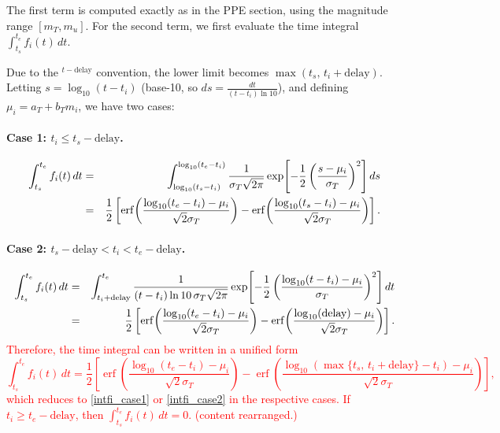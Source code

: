 \documentclass[extra,mreferee]{gji}
\theoremstyle{lemma}
\begin{document}
The first term is computed exactly as in the PPE section, using the magnitude range $[m_T, m_u]$. For the second term, we first evaluate the time integral $\int_{t_s}^{t_e} f_i(t)\, dt$.

Due to the ${}^{t - \text{delay}}$ convention, the lower limit becomes $\max(t_s,\, t_i + \text{delay})$. Letting $s = \log_{10}(t - t_i)$ (base-10, so $ds = \frac{dt}{(t - t_i)\ln 10}$), and defining $\mu_i = a_T + b_T m_i$, we have two cases:

\paragraph{Case 1: $t_i \le t_s - \text{delay}$.}
\begin{eqnarray}\label{intfi_case1}
\int_{t_s}^{t_e} f_i(t)\, dt 
&=& \int_{\log_{10}(t_s - t_i)}^{\log_{10}(t_e - t_i)} \frac{1}{\sigma_T \sqrt{2\pi}} 
\exp\!\left[-\frac{1}{2} \left( \frac{s - \mu_i}{\sigma_T} \right)^2 \right] ds \notag \\
&=& \frac{1}{2} \left[ \operatorname{erf}\!\left( \frac{\log_{10}(t_e - t_i) - \mu_i}{\sqrt{2}\sigma_T} \right)
- \operatorname{erf}\!\left( \frac{\log_{10}(t_s - t_i) - \mu_i}{\sqrt{2}\sigma_T} \right) \right].
\end{eqnarray}

\paragraph{Case 2: $t_s - \text{delay} < t_i < t_e - \text{delay}$.}
\begin{eqnarray}\label{intfi_case2}
\int_{t_s}^{t_e} f_i(t)\, dt 
&=& \int_{t_i + \text{delay}}^{t_e} \frac{1}{(t - t_i)\ln 10\, \sigma_T \sqrt{2\pi}} 
\exp\!\left[-\frac{1}{2} \left( \frac{\log_{10}(t - t_i) - \mu_i}{\sigma_T} \right)^2 \right] dt \notag \\
&=& \frac{1}{2} \left[ \operatorname{erf}\!\left( \frac{\log_{10}(t_e - t_i) - \mu_i}{\sqrt{2}\sigma_T} \right)
- \operatorname{erf}\!\left( \frac{\log_{10}(\text{delay}) - \mu_i}{\sqrt{2}\sigma_T} \right) \right].
\end{eqnarray}
\textcolor{red}{Therefore, the time integral can be written in a unified form
\[
\int_{t_s}^{t_e} f_i(t)\, dt
= \frac{1}{2} \left[
\operatorname{erf}\!\left( \frac{\log_{10}(t_e - t_i) - \mu_i}{\sqrt{2} \sigma_T} \right)
- \operatorname{erf}\!\left( \frac{\log_{10}(\max\{t_s,\, t_i + \text{delay}\} - t_i) - \mu_i}{\sqrt{2} \sigma_T} \right)
\right],
\]
which reduces to \eqref{intfi_case1} or \eqref{intfi_case2} in the respective cases. If $t_i \ge t_e - \text{delay}$, then $\int_{t_s}^{t_e} f_i(t)\, dt = 0$. (content rearranged.)}
\end{document}
